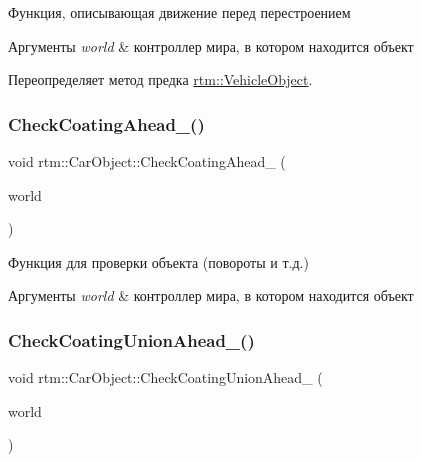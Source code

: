 Функция, описывающая движение перед перестроением 
\begin{DoxyParams}{Аргументы}
{\em world} & контроллер мира, в котором находится объект \\
\hline
\end{DoxyParams}


Переопределяет метод предка \hyperlink{classrtm_1_1_vehicle_object_a8976be533dfa4704f7b221c79d1fce99}{rtm\+::\+Vehicle\+Object}.

\mbox{\label{classrtm_1_1_car_object_a9e80c9029d84c425b43d6a0559d0c76c}} 
\subsubsection{\texorpdfstring{Check\+Coating\+Ahead\+\_\+()}{CheckCoatingAhead\_()}}
{\footnotesize\ttfamily void rtm\+::\+Car\+Object\+::\+Check\+Coating\+Ahead\+\_\+ (\begin{DoxyParamCaption}\item[{\hyperlink{classrtm_1_1_world_controller}{World\+Controller} $\ast$const}]{world }\end{DoxyParamCaption})\hspace{0.3cm}{\ttfamily [private]}}

Функция для проверки объекта (повороты и т.\+д.) 
\begin{DoxyParams}{Аргументы}
{\em world} & контроллер мира, в котором находится объект \\
\hline
\end{DoxyParams}
\mbox{\label{classrtm_1_1_car_object_a0cd1f15e3b28edde4271b92da250339f}} 
\subsubsection{\texorpdfstring{Check\+Coating\+Union\+Ahead\+\_\+()}{CheckCoatingUnionAhead\_()}}
{\footnotesize\ttfamily void rtm\+::\+Car\+Object\+::\+Check\+Coating\+Union\+Ahead\+\_\+ (\begin{DoxyParamCaption}\item[{\hyperlink{classrtm_1_1_world_controller}{World\+Controller} $\ast$const}]{world }\end{DoxyParamCaption})\hspace{0.3cm}{\ttfamily [private]}}

